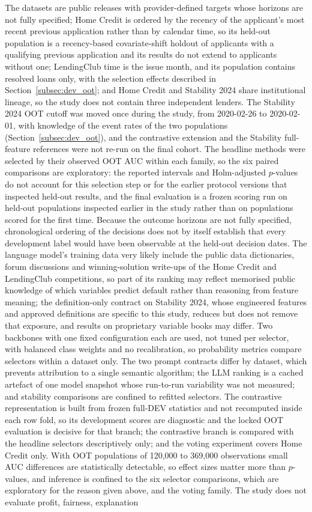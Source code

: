 \documentclass[final,5p,twocolumn]{elsarticle}
\begin{document}
The datasets are public releases with provider-defined targets whose horizons are not fully specified; Home Credit is ordered by the recency of the applicant's most recent previous application rather than by calendar time, so its held-out population is a recency-based covariate-shift holdout of applicants with a qualifying previous application and its results do not extend to applicants without one; LendingClub time is the issue month, and its population contains resolved loans only, with the selection effects described in Section~\ref{subsec:dev_oot}; and Home Credit and Stability 2024 share institutional lineage, so the study does not contain three independent lenders. The Stability 2024 OOT cutoff was moved once during the study, from 2020-02-26 to 2020-02-01, with knowledge of the event rates of the two populations (Section~\ref{subsec:dev_oot}), and the contrastive extension and the Stability full-feature references were not re-run on the final cohort. The headline methods were selected by their observed OOT AUC within each family, so the six paired comparisons are exploratory: the reported intervals and Holm-adjusted $p$-values do not account for this selection step or for the earlier protocol versions that inspected held-out results, and the final evaluation is a frozen scoring run on held-out populations inspected earlier in the study rather than on populations scored for the first time. Because the outcome horizons are not fully specified, chronological ordering of the decisions does not by itself establish that every development label would have been observable at the held-out decision dates. The language model's training data very likely include the public data dictionaries, forum discussions and winning-solution write-ups of the Home Credit and LendingClub competitions, so part of its ranking may reflect memorised public knowledge of which variables predict default rather than reasoning from feature meaning; the definition-only contract on Stability 2024, whose engineered features and approved definitions are specific to this study, reduces but does not remove that exposure, and results on proprietary variable books may differ. Two backbones with one fixed configuration each are used, not tuned per selector, with balanced class weights and no recalibration, so probability metrics compare selectors within a dataset only. The two prompt contracts differ by dataset, which prevents attribution to a single semantic algorithm; the LLM ranking is a cached artefact of one model snapshot whose run-to-run variability was not measured; and stability comparisons are confined to refitted selectors. The contrastive representation is built from frozen full-DEV statistics and not recomputed inside each row fold, so its development scores are diagnostic and the locked OOT evaluation is decisive for that branch; the contrastive branch is compared with the headline selectors descriptively only; and the voting experiment covers Home Credit only. With OOT populations of 120,000 to 369,000 observations small AUC differences are statistically detectable, so effect sizes matter more than $p$-values, and inference is confined to the six selector comparisons, which are exploratory for the reason given above, and the voting family. The study does not evaluate profit, fairness, explanation 
\end{document}
